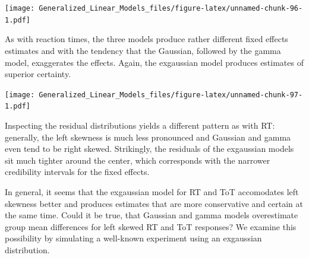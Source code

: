 \documentclass[]{svmono}
\newenvironment{Shaded}{\begin{snugshade}}{\end{snugshade}}
\newcommand{\KeywordTok}[1]{\textcolor[rgb]{0.13,0.29,0.53}{\textbf{#1}}}
\newcommand{\DataTypeTok}[1]{\textcolor[rgb]{0.13,0.29,0.53}{#1}}
\newcommand{\DecValTok}[1]{\textcolor[rgb]{0.00,0.00,0.81}{#1}}
\newcommand{\StringTok}[1]{\textcolor[rgb]{0.31,0.60,0.02}{#1}}
\newcommand{\OperatorTok}[1]{\textcolor[rgb]{0.81,0.36,0.00}{\textbf{#1}}}
\newcommand{\NormalTok}[1]{#1}
\theoremstyle{definition}
\theoremstyle{definition}
\theoremstyle{definition}
\theoremstyle{remark}
\begin{document}
\texttt{[image: Generalized\_Linear\_Models\_files/figure-latex/unnamed-chunk-96-1.pdf]}

As with reaction times, the three models produce rather different fixed
effects estimates and with the tendency that the Gaussian, followed by
the gamma model, exaggerates the effects. Again, the exgaussian model
produces estimates of superior certainty.

\begin{Shaded}
\end{Shaded}

\texttt{[image: Generalized\_Linear\_Models\_files/figure-latex/unnamed-chunk-97-1.pdf]}

Inspecting the residual distributions yields a different pattern as with
RT: generally, the left skewness is much less pronounced and Gaussian
and gamma even tend to be right skewed. Strikingly, the residuals of the
exgaussian models sit much tighter around the center, which corresponds
with the narrower credibility intervals for the fixed effects.

In general, it seems that the exgaussian model for RT and ToT
accomodates left skewness better and produces estimates that are more
conservative and certain at the same time. Could it be true, that
Gaussian and gamma models overestimate group mean differences for left
skewed RT and ToT responses? We examine this possibility by simulating a
well-known experiment using an exgaussian distribution.
\end{document}

